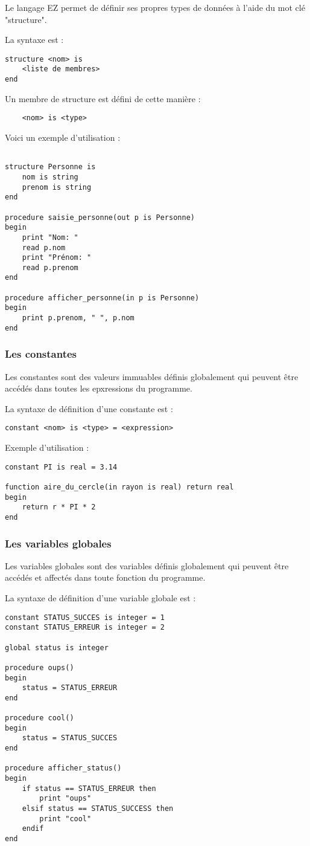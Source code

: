 Le langage EZ permet de définir ses propres types de données à l'aide
du mot clé "structure".

La syntaxe est :
\begin{verbatim}
structure <nom> is
    <liste de membres>
end
\end{verbatim}

Un membre de structure est défini de cette manière :
\begin{verbatim}
    <nom> is <type>
\end{verbatim}

Voici un exemple d'utilisation :
\begin{verbatim}

structure Personne is
    nom is string
    prenom is string
end

procedure saisie_personne(out p is Personne)
begin
    print "Nom: "
    read p.nom
    print "Prénom: "
    read p.prenom
end

procedure afficher_personne(in p is Personne)
begin
    print p.prenom, " ", p.nom
end

\end{verbatim}


\subsubsection{Les constantes}

Les constantes sont des valeurs immuables définis globalement qui peuvent être
accédés dans toutes les epxressions du programme.

La syntaxe de définition d'une constante est :
\begin{verbatim}
constant <nom> is <type> = <expression>
\end{verbatim}

Exemple d'utilisation :
\begin{verbatim}
constant PI is real = 3.14

function aire_du_cercle(in rayon is real) return real
begin
    return r * PI * 2
end
\end{verbatim}


\subsubsection{Les variables globales}

Les variables globales sont des variables définis globalement qui peuvent être
accédés et affectés dans toute fonction du programme.

La syntaxe de définition d'une variable globale est :
\begin{verbatim}
constant STATUS_SUCCES is integer = 1
constant STATUS_ERREUR is integer = 2

global status is integer

procedure oups()
begin
    status = STATUS_ERREUR
end

procedure cool()
begin
    status = STATUS_SUCCES
end

procedure afficher_status()
begin
    if status == STATUS_ERREUR then
        print "oups"
    elsif status == STATUS_SUCCESS then
        print "cool"
    endif
end
\end{verbatim}



